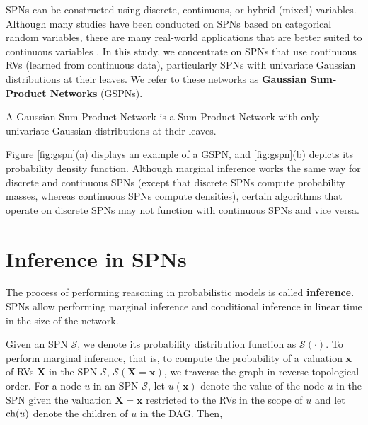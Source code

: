 SPNs can be constructed using discrete, continuous, or hybrid (mixed) variables. Although many studies have been conducted on SPNs based on categorical random variables, there are many real-world applications that are better suited to continuous variables \citep{Jaini2016}. In this study, we concentrate on SPNs that use continuous RVs (learned from continuous data), particularly SPNs with univariate Gaussian distributions at their leaves. We refer to these networks as \textbf{Gaussian Sum-Product Networks} (GSPNs).

\begin{definition}
  A Gaussian Sum-Product Network is a Sum-Product Network with only univariate Gaussian distributions at their leaves.
\end{definition}

\noindent Figure \ref{fig:gspn}(a) displays an example of a GSPN, and \ref{fig:gspn}(b) depicts its probability density function. Although marginal inference works the same way for discrete and continuous SPNs (except that discrete SPNs compute probability masses, whereas continuous SPNs compute densities), certain algorithms that operate on discrete SPNs may not function with continuous SPNs and vice versa.

\section{Inference in SPNs}
\label{sec:spn:evaluation}

The process of performing reasoning in probabilistic models is called \textbf{inference}. SPNs allow performing marginal inference and conditional inference in linear time in the size of the network.

Given an SPN $\mathcal{S}$, we denote its probability distribution function as $\mathcal{S}(\cdot)$. To perform marginal inference, that is, to compute the probability of a valuation $\mathbf{x}$ of RVs $\mathbf{X}$ in the SPN $\mathcal{S}$, $\mathcal{S}(\mathbf{X} = \mathbf{x})$, we traverse the graph in reverse topological order. For a node $u$ in an SPN $\mathcal{S}$, let $u(\mathbf{x})$ denote the value of the node $u$ in the SPN given the valuation $\mathbf{X} = \mathbf{x}$ restricted to the RVs in the scope of $u$ and let $\operatorname*{ch}(u)$ denote the children of $u$ in the DAG. Then,

